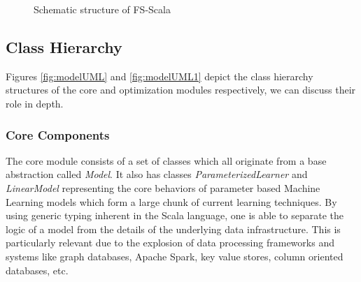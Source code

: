 \documentclass[conference, cmex10]{IEEEtran}
\begin{document}
\begin{figure}[h] 
\begin{adjustbox}{max width=0.5\textwidth}
\end{adjustbox}
\caption{Schematic structure of FS-Scala}
\label{fig:struct}
\end{figure}

\subsection*{Class Hierarchy}

Figures \ref{fig:modelUML} and \ref{fig:modelUML1} depict the class hierarchy structures of the core and optimization modules respectively, we can discuss their role in depth.

\subsubsection*{Core Components}
The core module consists of a set of classes which all originate from a base abstraction called \textit{Model}. It also has classes \textit{ParameterizedLearner} and \textit{LinearModel} representing the core behaviors of parameter based Machine Learning models which form a large chunk of current learning techniques. By using generic typing inherent in the Scala language, one is able to separate the logic of a model from the details of the underlying data infrastructure. This is particularly relevant due to the explosion of data processing frameworks and systems like graph databases, Apache Spark, key value stores, column oriented databases, etc.
\end{document}
